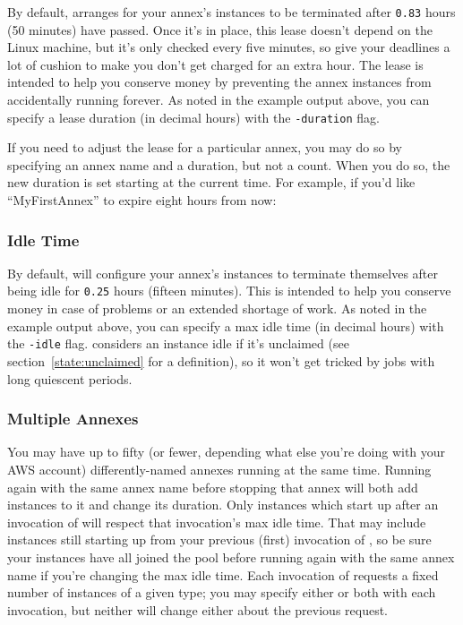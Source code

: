 By default,  arranges for your annex's instances to be terminated
after \texttt{0.83} hours (50 minutes) have passed.  Once it's in place, this
lease doesn't depend on the Linux machine, but it's only checked every five
minutes, so give your deadlines a lot of cushion to make you don't get charged
for an extra hour.  The lease is intended to help you conserve money by
preventing the annex instances from accidentally running forever.  As noted in
the example output above, you can specify a lease duration (in decimal hours)
with the \texttt{-duration} flag.

If you need to adjust the lease for a particular annex, you may do so by
specifying an annex name and a duration, but not a count.  When you do so,
the new duration is set starting at the current time.  For example, if you'd
like ``MyFirstAnnex'' to expire eight hours from now:


\subsubsection{Idle Time}

By default,  will configure your annex's instances to terminate
themselves after being idle for \texttt{0.25} hours (fifteen minutes).  This
is intended to help you conserve money in case of problems or an extended
shortage of work.  As noted in the example output above, you can specify a max
idle time (in decimal hours) with the \texttt{-idle} flag.  
considers an instance idle if it's unclaimed (see
section~\ref{state:unclaimed} for a definition), so it won't get tricked by
jobs with long quiescent periods.

\subsubsection{Multiple Annexes}

You may have up to fifty (or fewer, depending what else you're doing with your
AWS account) differently-named annexes running at the same time.  Running
 again with the same annex name before stopping that annex will
both add instances to it and change its duration.  Only instances which start
up after an invocation of  will respect that invocation's max
idle time.  That may include instances still starting up from your previous
(first) invocation of , so be sure your instances have all
joined the pool before running  again with the same annex name
if you're changing the max idle time.  Each invocation of 
requests a fixed number of instances of a given type; you may specify either
or both with each invocation, but neither will change either about the
previous request.

